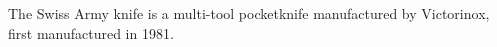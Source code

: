 The Swiss Army knife is a multi-tool pocketknife manufactured by Victorinox, first manufactured in 1981.
